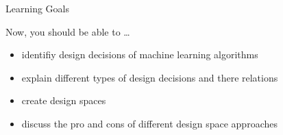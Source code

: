\begin{frame}[c]{Learning Goals}

Now, you should be able to \ldots

\begin{itemize}
  \item identifiy design decisions of machine learning algorithms
  \item explain different types of design decisions and there relations
  \item create design spaces
  \item discuss the pro and cons of different design space approaches
\end{itemize}

\end{frame}

